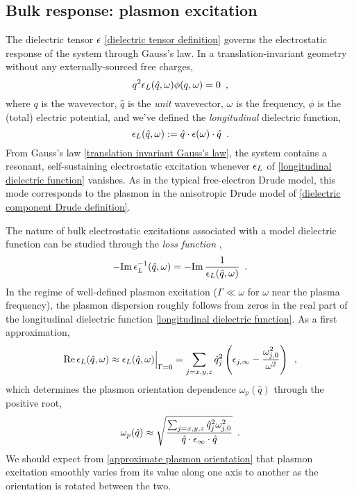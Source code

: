 \subsection{Bulk response: plasmon excitation}

The dielectric tensor $\epsilon$ \eqref{dielectric tensor definition} governs the electrostatic response of the system through Gauss's law.  In a translation-invariant geometry without any externally-sourced free charges,
\begin{equation}
    \label{translation invariant Gauss's law}
    q^2 \epsilon_L(\hat q,\omega) \phi(q,\omega) = 0\,\,\,,
\end{equation}
where $q$ is the wavevector, $\hat q$ is the {\it unit} wavevector, $\omega$ is the frequency, $\phi$ is the (total) electric potential, and we've defined the {\it longitudinal} dielectric function,
\begin{equation}
    \label{longitudinal dielectric function}
    \epsilon_L(\hat q,\omega) := \hat q\cdot \epsilon(\omega)\cdot \hat q\,\,\,.
\end{equation}
From Gauss's law \eqref{translation invariant Gauss's law}, the system contains a resonant, self-sustaining electrostatic excitation whenever $\epsilon_L$ of \eqref{longitudinal dielectric function} vanishes.  As in the typical free-electron Drude model, this mode corresponds to the plasmon in the anisotropic Drude model of \eqref{dielectric component Drude definition}.

The nature of bulk electrostatic excitations associated with a model dielectric function can be studied through the {\it loss function} ,
\begin{equation}
    \label{bulk loss function}
    -\text{Im}\, \epsilon^{-1}_L(\hat q,\omega) = -\text{Im}\,\frac{1}{\epsilon_L(\hat q,\omega)}
    \,\,\,.
\end{equation}
In the regime of well-defined plasmon excitation ($\Gamma \ll \omega$ for $\omega$ near the plasma frequency), the plasmon dispersion roughly follows from zeros in the real part of the longitudinal dielectric function \eqref{longitudinal dielectric function}.  As a first approximation,
\begin{equation}
    \label{real part of longitudinal dielectric function without damping}
    \text{Re}\,\epsilon_L(\hat q, \omega) \approx \epsilon_L(\hat q, \omega)\Big|_{\Gamma = 0}
    =
    \sum_{j=x,y,z} \hat q_j^2\left(\epsilon_{j,\infty} - \frac{\omega_{j,0}^2}{\omega^2}\right)
    \,\,\,,
\end{equation}
which determines the plasmon orientation dependence $\omega_p(\hat q)$ through the positive root,
\begin{equation}
    \label{approximate plasmon orientation}
    \omega_p(\hat q) \approx 
    \sqrt{\frac{\sum_{j=x,y,z} \hat q_j^2 \omega_{j,0}^2}{\hat q \cdot \epsilon_{\infty} \cdot \hat q}}
    \,\,\,.
\end{equation}
We should expect from \eqref{approximate plasmon orientation} that plasmon excitation smoothly varies from its value along one axis to another as the orientation is rotated between the two.


